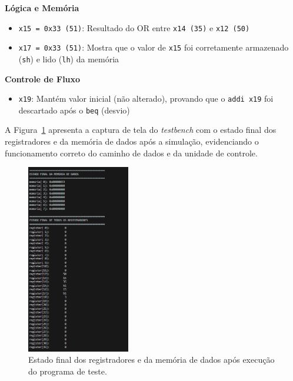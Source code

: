 \documentclass[12pt, a4paper]{article}
\begin{document}
\vspace{0.3cm}

\noindent\textbf{Lógica e Memória}
\begin{itemize}
    \item \texttt{x15 = 0x33 (51)}: Resultado do OR entre \texttt{x14 (35)} e \texttt{x12 (50)}
    \item \texttt{x17 = 0x33 (51)}: Mostra que o valor de \texttt{x15} foi corretamente armazenado (\texttt{sh}) e lido (\texttt{lh}) da memória
\end{itemize}

\vspace{0.3cm}

\noindent\textbf{Controle de Fluxo}
\begin{itemize}
    \item \texttt{x19}: Mantém valor inicial (não alterado), provando que o \texttt{addi x19} foi descartado após o \texttt{beq} (desvio)
\end{itemize}
\vspace{0.6cm}
A Figura~\ref{fig:resultado-simulacao} apresenta a captura de tela do \textit{testbench} com o estado final dos registradores e da memória de dados após a simulação, evidenciando o funcionamento correto do caminho de dados e da unidade de controle.

\begin{figure}[H]
    \centering
    \includegraphics[width=0.4\textwidth]{teste.png}
    \caption{Estado final dos registradores e da memória de dados após execução do programa de teste.}
    \label{fig:resultado-simulacao}
\end{figure}
\end{document}
